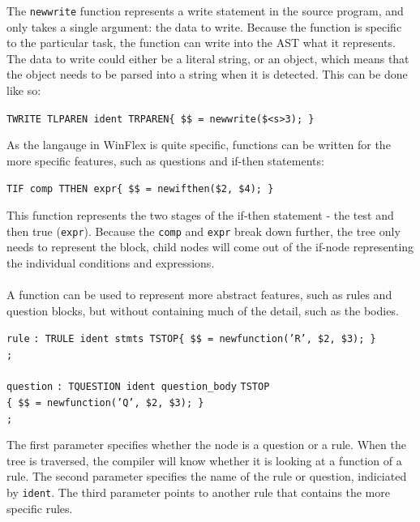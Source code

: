 \documentclass[12pt]{report}
\begin{document}
The \texttt{newwrite} function represents a write statement in the source program, and only takes a single argument: the data to write.  Because the function is specific to the particular task, the function can write into the AST what it represents.  The data to write could either be a literal string, or an object, which means that the object needs to be parsed into a string when it is detected.  This can be done like so:\\
\begin{center}
	\texttt{TWRITE TLPAREN ident TRPAREN\quad\quad\{ \$\$ = newwrite(\$<s>3); \}}
\end{center}
As the langauge in WinFlex is quite specific, functions can be written for the more specific features, such as questions and if-then statements:
\begin{center}
	\texttt{TIF comp TTHEN expr\quad\quad\quad\{ \$\$ = newifthen(\$2, \$4); \}}
\end{center}
This function represents the two stages of the if-then statement - the test and then true (\texttt{expr}).  Because the \texttt{comp} and \texttt{expr} break down further, the tree only needs to represent the block, child nodes will come out of the if-node representing the individual conditions and expressions.\\
\\
A function can be used to represent more abstract features, such as rules and question blocks, but without containing much of the detail, such as the bodies.
\begin{tabbing}
	\texttt{rule} \= \texttt{: TRULE ident stmts TSTOP\quad\quad\quad\{ \$\$ = newfunction('R', \$2, \$3); \}}\\
	\> \texttt{;}\\
	\\
	\texttt{question} \= \texttt{: TQUESTION ident question\_body} \= \texttt{TSTOP}\\
	\> \> \texttt{\{ \$\$ = newfunction('Q', \$2, \$3); \}}\\
	\> \texttt{;}\\
\end{tabbing}
The first parameter specifies whether the node is a question or a rule.  When the tree is traversed, the compiler will know whether it is looking at a function of a rule.  The second parameter specifies the name of the rule or question, indiciated by \texttt{ident}.  The third parameter points to another rule that contains the more specific rules.\\
\\
\end{document}

